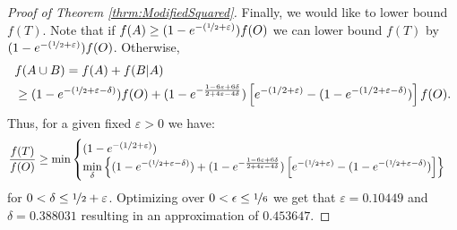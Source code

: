 \documentclass[a4paper,UKenglish,cleveref, autoref]{lipics-v2019}
\begin{document}
\begin{proof}[Proof of Theorem \ref{thrm:ModifiedSquared}]
Finally, we would like to lower bound $f(T)$.
Note that if $f(A) \geq (1 - e^{-(\nicefrac[]{1}{2} + \varepsilon)})f(O)$ we can lower bound $f(T)$ by $(1 - e^{-(\nicefrac[]{1}{2} + \varepsilon)})f(O)$.
Otherwise,
\begin{align}
	&f(A \cup B)
	 = \nonumber
	f(A) + f(B|A)
	\\ & \geq
	(1-e^{-(\nicefrac[]{1}{2} + \varepsilon - \delta)})f(O)
	+
	(1-e^{-\frac{1-6\varepsilon+6\delta}{2+4\varepsilon-4\delta}})
	\left[
	e^{-(1/2 + \varepsilon)}
	- (1 - e^{-(1/2 + \varepsilon - \delta)})
	\right] f(O).
\end{align}
Thus, for a given fixed $\varepsilon > 0$ we have:
\begin{equation}
	\frac{f(T)}{f(O)} \geq  \min \begin{cases}
		(1 - e^{-(1/2 + \varepsilon)})
		\\
			\displaystyle{\min_{\delta}}\left\{
			(1-e^{-(\nicefrac[]{1}{2} + \varepsilon - \delta)})
			+
			(1-e^{-\frac{1-6\varepsilon+6\delta}{2+4\varepsilon-4\delta}})
			\left[
			e^{-(\nicefrac[]{1}{2} + \varepsilon)}
			- (1 - e^{-(\nicefrac[]{1}{2} + \varepsilon - \delta)})
			\right]\right\}
	\end{cases}
\end{equation}
for $0 < \delta \leq \nicefrac[]{1}{2} + \varepsilon$.
Optimizing over $0 < \epsilon \leq \nicefrac[]{1}{6}$ we get that $\varepsilon = 0.10449$ and $\delta = 0.388031$ resulting in an approximation of $0.453647$.
\end{proof}
\end{document}

